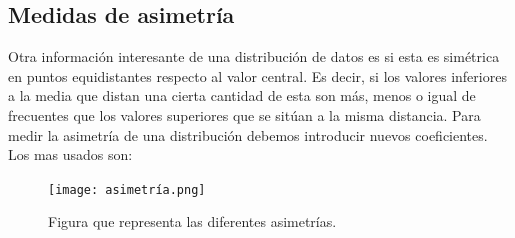 \documentclass[12pt,a4paper]{book}
\begin{document}
\subsection{Medidas de asimetría}

Otra información interesante de una distribución de datos es si esta es simétrica en puntos equidistantes respecto al valor central. Es decir, si los valores inferiores a la media que distan una cierta cantidad de esta son más, menos o igual de frecuentes que los valores superiores que se sitúan a la misma distancia. Para medir la asimetría de una distribución debemos introducir nuevos coeficientes. Los mas usados son:


\begin{figure}[h!] \centering
\texttt{[image: asimetría.png]}
\caption{Figura que representa las diferentes asimetrías.}
\end{figure}
\end{document}

